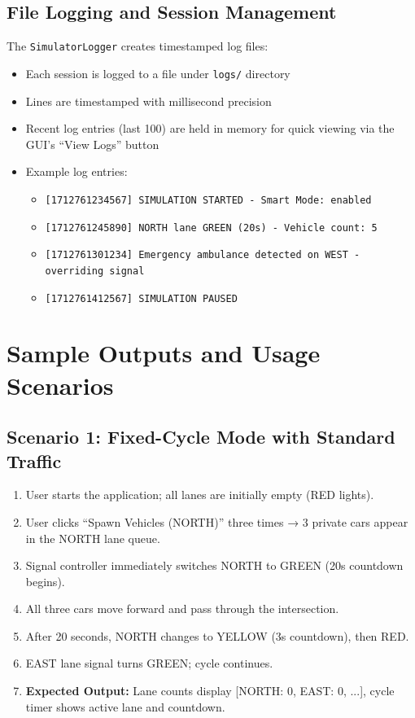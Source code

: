 \documentclass[12pt,a4paper]{article}
\begin{document}
\subsection{File Logging and Session Management}
The \texttt{SimulatorLogger} creates timestamped log files:
\begin{itemize}
    \item Each session is logged to a file under \texttt{logs/} directory
    \item Lines are timestamped with millisecond precision
    \item Recent log entries (last 100) are held in memory for quick viewing via the GUI's ``View Logs'' button
    \item Example log entries:
    \begin{itemize}
        \item \texttt{[1712761234567] SIMULATION STARTED - Smart Mode: enabled}
        \item \texttt{[1712761245890] NORTH lane GREEN (20s) - Vehicle count: 5}
        \item \texttt{[1712761301234] Emergency ambulance detected on WEST - overriding signal}
        \item \texttt{[1712761412567] SIMULATION PAUSED}
    \end{itemize}
\end{itemize}

\section{Sample Outputs and Usage Scenarios}

\subsection{Scenario 1: Fixed-Cycle Mode with Standard Traffic}
\begin{enumerate}
    \item User starts the application; all lanes are initially empty (RED lights).
    \item User clicks ``Spawn Vehicles (NORTH)'' three times  → 3 private cars appear in the NORTH lane queue.
    \item Signal controller immediately switches NORTH to GREEN (20s countdown begins).
    \item All three cars move forward and pass through the intersection.
    \item After 20 seconds, NORTH changes to YELLOW (3s countdown), then RED.
    \item EAST lane signal turns GREEN; cycle continues.
    \item \textbf{Expected Output:} Lane counts display [NORTH: 0, EAST: 0, ...], cycle timer shows active lane and countdown.
\end{enumerate}
\end{document}
